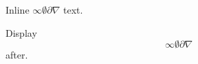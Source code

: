 \documentclass[12pt]{article}
\begin{document}
Inline $\infty \emptyset \partial \nabla$ text.

Display \[ \infty \emptyset \partial \nabla \] after.
\end{document}
